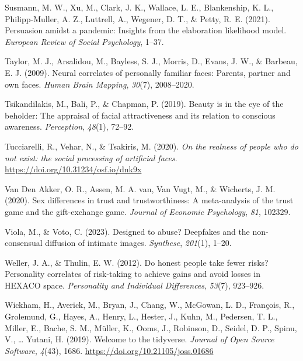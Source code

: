 \documentclass[
  man,floatsintext]{apa6}
\newlength{\cslhangindent}
\newlength{\cslentryspacingunit} %
\newenvironment{CSLReferences}[2] %
 {%
  \setlength{\parindent}{0pt}
  \ifodd #1
  \let\oldpar\par
  \def\par{\hangindent=\cslhangindent\oldpar}
  \fi
  \setlength{\parskip}{#2\cslentryspacingunit}
 }%
 {}
\begin{document}
\begin{CSLReferences}{1}{0}
\leavevmode{}%
Susmann, M. W., Xu, M., Clark, J. K., Wallace, L. E., Blankenship, K. L., Philipp-Muller, A. Z., Luttrell, A., Wegener, D. T., \& Petty, R. E. (2021). Persuasion amidst a pandemic: Insights from the elaboration likelihood model. \emph{European Review of Social Psychology}, 1--37.

\leavevmode{}%
Taylor, M. J., Arsalidou, M., Bayless, S. J., Morris, D., Evans, J. W., \& Barbeau, E. J. (2009). Neural correlates of personally familiar faces: Parents, partner and own faces. \emph{Human Brain Mapping}, \emph{30}(7), 2008--2020.

\leavevmode{}%
Tsikandilakis, M., Bali, P., \& Chapman, P. (2019). Beauty is in the eye of the beholder: The appraisal of facial attractiveness and its relation to conscious awareness. \emph{Perception}, \emph{48}(1), 72--92.

\leavevmode{}%
Tucciarelli, R., Vehar, N., \& Tsakiris, M. (2020). \emph{On the realness of people who do not exist: the social processing of artificial faces}. \url{https://doi.org/10.31234/osf.io/dnk9x}

\leavevmode{}%
Van Den Akker, O. R., Assen, M. A. van, Van Vugt, M., \& Wicherts, J. M. (2020). Sex differences in trust and trustworthiness: A meta-analysis of the trust game and the gift-exchange game. \emph{Journal of Economic Psychology}, \emph{81}, 102329.

\leavevmode{}%
Viola, M., \& Voto, C. (2023). Designed to abuse? Deepfakes and the non-consensual diffusion of intimate images. \emph{Synthese}, \emph{201}(1), 1--20.

\leavevmode{}%
Weller, J. A., \& Thulin, E. W. (2012). Do honest people take fewer risks? Personality correlates of risk-taking to achieve gains and avoid losses in HEXACO space. \emph{Personality and Individual Differences}, \emph{53}(7), 923--926.

\leavevmode{}%
Wickham, H., Averick, M., Bryan, J., Chang, W., McGowan, L. D., François, R., Grolemund, G., Hayes, A., Henry, L., Hester, J., Kuhn, M., Pedersen, T. L., Miller, E., Bache, S. M., Müller, K., Ooms, J., Robinson, D., Seidel, D. P., Spinu, V., \ldots{} Yutani, H. (2019). Welcome to the {tidyverse}. \emph{Journal of Open Source Software}, \emph{4}(43), 1686. \url{https://doi.org/10.21105/joss.01686}

\end{CSLReferences}


\clearpage
\renewcommand{\listfigurename}{Figure captions}
\end{document}
